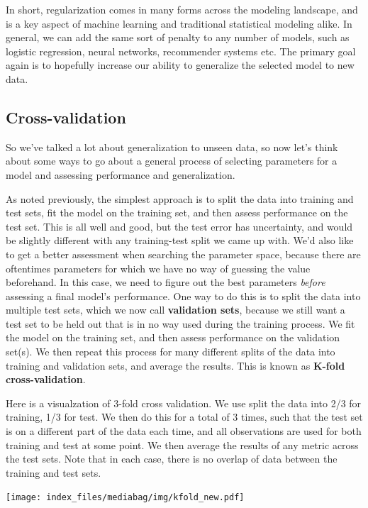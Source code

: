 \documentclass[
  letterpaper,
]{krantz}
\begin{document}
In short, regularization comes in many forms across the modeling
landscape, and is a key aspect of machine learning and traditional
statistical modeling alike. In general, we can add the same sort of
penalty to any number of models, such as logistic regression, neural
networks, recommender systems etc. The primary goal again is to
hopefully increase our ability to generalize the selected model to new
data.

\subsection{Cross-validation}\label{cross-validation}

So we've talked a lot about generalization to unseen data, so now let's
think about some ways to go about a general process of selecting
parameters for a model and assessing performance and generalization.

As noted previously, the simplest approach is to split the data into
training and test sets, fit the model on the training set, and then
assess performance on the test set. This is all well and good, but the
test error has uncertainty, and would be slightly different with any
training-test split we came up with. We'd also like to get a better
assessment when searching the parameter space, because there are
oftentimes parameters for which we have no way of guessing the value
beforehand. In this case, we need to figure out the best parameters
\emph{before} assessing a final model's performance. One way to do this
is to split the data into multiple test sets, which we now call
\textbf{validation sets}, because we still want a test set to be held
out that is in no way used during the training process. We fit the model
on the training set, and then assess performance on the validation
set(s). We then repeat this process for many different splits of the
data into training and validation sets, and average the results. This is
known as \textbf{K-fold cross-validation}.

Here is a visualzation of 3-fold cross validation. We use split the data
into 2/3 for training, 1/3 for test. We then do this for a total of 3
times, such that the test set is on a different part of the data each
time, and all observations are used for both training and test at some
point. We then average the results of any metric across the test sets.
Note that in each case, there is no overlap of data between the training
and test sets.

\texttt{[image: index\_files/mediabag/img/kfold\_new.pdf]}
\end{document}
